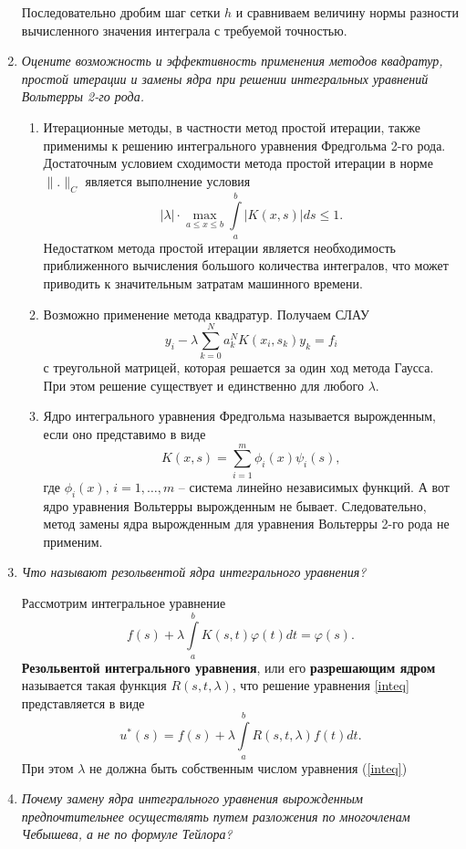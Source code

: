 \documentclass[12pt, a4paper]{article}
\begin{document}
\begin{enumerate}
		Последовательно дробим шаг сетки $h$ и сравниваем величину нормы разности вычисленного значения интеграла с требуемой точностью.
		\item \textit{Оцените возможность и эффективность применения методов квадратур, простой итерации и замены ядра при решении интегральных уравнений Вольтерры 2-го рода.}
		\smallskip
		\begin{enumerate}
			\item Итерационные методы, в частности метод простой итерации, также применимы к решению интегрального уравнения Фредгольма 2-го рода. Достаточным условием сходимости метода простой итерации в норме $\|.\|_C$ является выполнение условия
			\[
			|\lambda|\cdot \max\limits_{a\le x\le b}\int\limits_a^b|K(x,s)|ds\le1.
			\]
			Недостатком метода простой итерации является необходимость приближенного вычисления большого количества интегралов, что может приводить к значительным затратам машинного времени.
			\item Возможно применение метода квадратур. Получаем СЛАУ
			\[
			y_i-\lambda\sum_{k=0}^Na_k^N
			K(x_i,s_k)y_k=f_i			\]
			с треугольной матрицей, которая решается за один ход метода Гаусса. При этом решение существует и единственно для любого $\lambda$.
			\item Ядро интегрального уравнения Фредгольма называется вырожденным, если оно представимо в виде
			\[
			K(x,s)=\sum_{i=1}^m\phi_i(x)\psi_i(s),
			\]
			где $\phi_i(x),\,i=1,\dots,m$ -- система линейно независимых функций. А вот ядро уравнения Вольтерры вырожденным не бывает. Следовательно, метод замены ядра вырожденным для уравнения Вольтерры 2-го рода не применим.
		\end{enumerate}
		\item \textit{Что называют резольвентой ядра интегрального уравнения?}
		\smallskip
		
		Рассмотрим интегральное уравнение
		\begin{equation}
			f(s)+\lambda\int\limits_a^bK(s,t)\varphi(t)dt=\varphi(s).
			\label{inteq}
		\end{equation}
		\textbf{Резольвентой интегрального уравнения}, или его \textbf{разрешающим ядром} называется такая функция $R(s,t,\lambda)$, что решение уравнения \ref{inteq} представляется в виде
		\[
		u^*(s)=f(s)+\lambda\int\limits_a^bR(s,t,\lambda)f(t)dt.
		\]
		При этом $\lambda$ не должна быть собственным числом уравнения (\ref{inteq})
		\item \textit{Почему замену ядра интегрального уравнения вырожденным предпочтительнее осуществлять путем разложения по многочленам Чебышева, а не по формуле Тейлора?}
		\smallskip
		

\end{enumerate}
\end{document}
